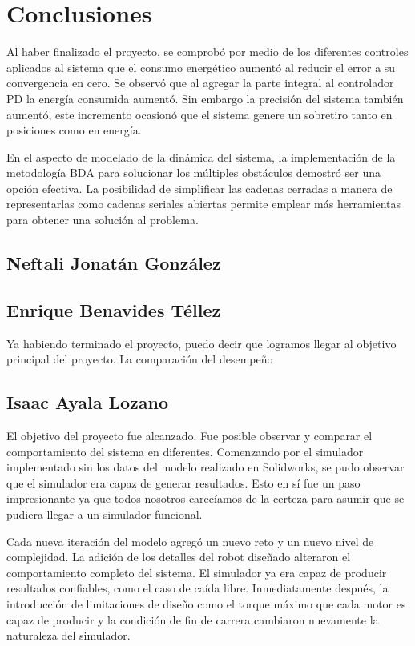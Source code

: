 \section{Conclusiones}
Al haber finalizado el proyecto, se comprobó por medio de los diferentes controles aplicados al sistema que el consumo energético aumentó al reducir el error a su convergencia en cero. 
Se observó que al agregar la parte integral al controlador PD la energía consumida aumentó. Sin embargo la precisión del sistema también aumentó, este incremento ocasionó que el sistema genere un sobretiro tanto en posiciones como en energía.

En el aspecto de modelado de la dinámica del sistema, la implementación de la metodología BDA para solucionar los múltiples obstáculos demostró ser una opción efectiva.
La posibilidad de simplificar las cadenas cerradas a manera de representarlas como cadenas seriales abiertas permite emplear más herramientas para obtener una solución al problema.



\subsection{Neftali Jonatán González}

\subsection{Enrique Benavides Téllez}
Ya habiendo terminado el proyecto, puedo decir que logramos llegar al objetivo principal del proyecto. La comparación del desempeño


\subsection{Isaac Ayala Lozano}
El objetivo del proyecto fue alcanzado. 
Fue posible observar y comparar el comportamiento del sistema 
en diferentes. 
Comenzando por el simulador implementado sin los datos del modelo realizado en Solidworks, se pudo observar que el simulador era capaz de generar resultados.
Esto en sí fue un paso impresionante ya que todos nosotros carecíamos de la certeza para asumir que se pudiera llegar a un simulador funcional.

Cada nueva iteración del modelo agregó un nuevo reto y un nuevo nivel de complejidad. 
La adición de los detalles del robot diseñado alteraron el comportamiento completo del sistema. 
El simulador ya era capaz de producir resultados confiables, como el caso de caída libre.
Inmediatamente después, la introducción de limitaciones de diseño como el torque máximo que cada motor es capaz de producir y la condición de fin de carrera
cambiaron nuevamente la naturaleza del simulador.


